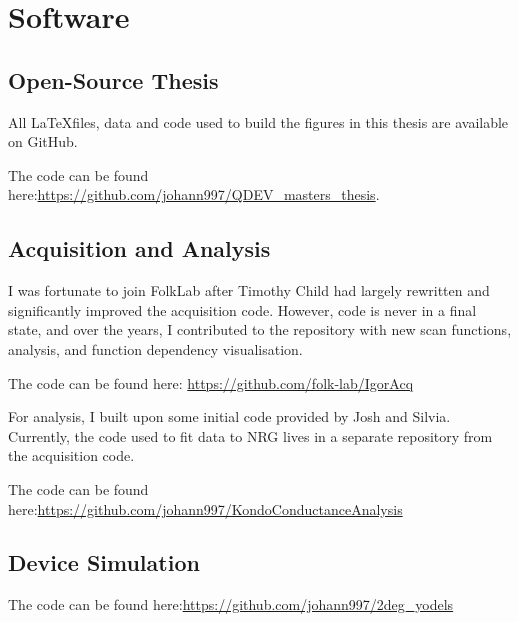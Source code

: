 \chapter{Software}\label{cha:appendix2}


\section{Open-Source Thesis}
All \LaTeX files, data and code used to build the figures in this thesis are available on GitHub.

The code can be found here:\newline \url{https://github.com/johann997/QDEV_masters_thesis}.

\section{Acquisition and Analysis}

I was fortunate to join FolkLab after Timothy Child had largely rewritten and significantly improved the acquisition code. However, code is never in a final state, and over the years, I contributed to the repository with new scan functions, analysis, and function dependency visualisation.

The code can be found here:\newline 
\url{https://github.com/folk-lab/IgorAcq}



For analysis, I built upon some initial code provided by Josh and Silvia. Currently, the code used to fit data to NRG lives in a separate repository from the acquisition code. 

The code can be found here:\newline \url{https://github.com/johann997/KondoConductanceAnalysis}

\section{Device Simulation}

The code can be found here:\newline \url{https://github.com/johann997/2deg_yodels}



